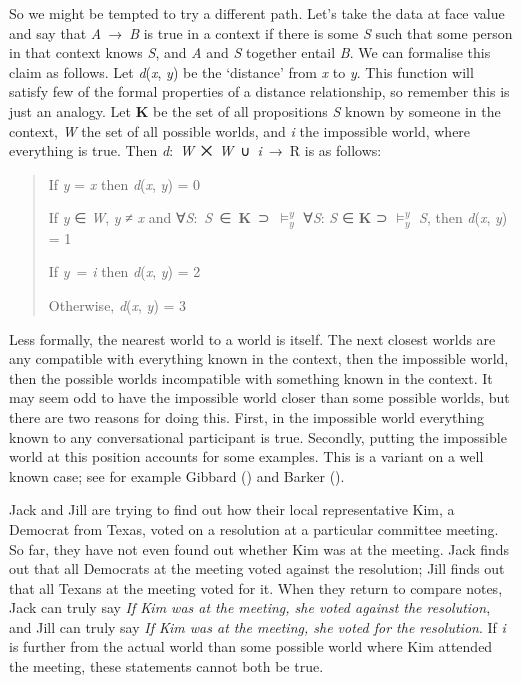 \documentclass[
  10pt,
  letterpaper,
  DIV=11,
  numbers=noendperiod,
  twoside]{scrartcl}
\begin{document}
So we might be tempted to try a different path. Let's take the data at
face value and say that \emph{A}~→~\emph{B} is true in a context if
there is some \emph{S} such that some person in that context knows
\emph{S}, and \emph{A} and \emph{S} together entail \emph{B}. We can
formalise this claim as follows. Let \emph{d}(\emph{x}, \emph{y}) be the
`distance' from \emph{x} to \emph{y}. This function will satisfy few of
the formal properties of a distance relationship, so remember this is
just an analogy. Let \textbf{K} be the set of all propositions \emph{S}
known by someone in the context, \emph{W} the set of all possible
worlds, and \emph{i} the impossible world, where everything is true.
Then \emph{d}:~\emph{W}~⨉~\emph{W}~∪~\emph{i}~→~R is as follows:

\begin{quote}
If \emph{y} = \emph{x} then \emph{d}(\emph{x}, \emph{y}) = 0

If \emph{y} ∈ \emph{W}, \emph{y} ≠ \emph{x} and
∀\emph{S}:~\emph{S}~∈~\textbf{K}~⊃~\(\vDash_y^y\) ∀\emph{S}: \emph{S} ∈
\textbf{K} ⊃ \(\vDash_y^y\) \emph{S}, then \emph{d}(\emph{x}, \emph{y})
= 1

If \emph{y}~= \emph{i} then \emph{d}(\emph{x}, \emph{y}) = 2

Otherwise, \emph{d}(\emph{x}, \emph{y}) = 3
\end{quote}

Less formally, the nearest world to a world is itself. The next closest
worlds are any compatible with everything known in the context, then the
impossible world, then the possible worlds incompatible with something
known in the context. It may seem odd to have the impossible world
closer than some possible worlds, but there are two reasons for doing
this. First, in the impossible world everything known to any
conversational participant is true. Secondly, putting the impossible
world at this position accounts for some examples. This is a variant on
a well known case; see for example Gibbard
() and Barker
().

Jack and Jill are trying to find out how their local representative Kim,
a Democrat from Texas, voted on a resolution at a particular committee
meeting. So far, they have not even found out whether Kim was at the
meeting. Jack finds out that all Democrats at the meeting voted against
the resolution; Jill finds out that all Texans at the meeting voted for
it. When they return to compare notes, Jack can truly say \emph{If Kim
was at the meeting, she voted against the resolution}, and Jill can
truly say \emph{If Kim was at the meeting, she voted for the
resolution}. If \emph{i} is further from the actual world than some
possible world where Kim attended the meeting, these statements cannot
both be true.
\end{document}
